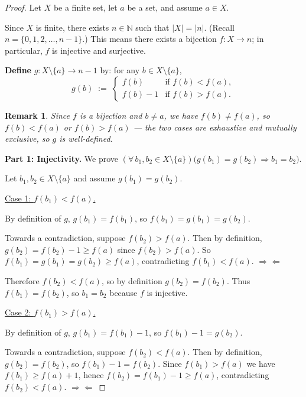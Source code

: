 \documentclass[11pt]{article}
\theoremstyle{defstyle}
\theoremstyle{thmstyle}
\theoremstyle{notstyle}
\newtheorem*{remark}{Remark}
\newcommand{\N}{\mathbb{N}}
\begin{document}
\begin{thmbox}
\begin{proof}
Let $X$ be a finite set, let $a$ be a set, and assume $a \in X$.

Since $X$ is finite, there exists $n \in \N$ such that $|X| = |n|$.
(Recall $n = \{0, 1, 2, \ldots, n-1\}$.)
This means there exists a bijection $f\colon X \to n$; in particular, $f$ is injective
and surjective.

\medskip
\noindent\textbf{Define} $g\colon X \setminus \{a\} \to n-1$ by: for any
$b \in X \setminus \{a\}$,
\[
  g(b) \;:=\;
  \begin{cases}
    f(b)     & \text{if } f(b) < f(a), \\
    f(b) - 1 & \text{if } f(b) > f(a).
  \end{cases}
\]

\begin{notebox}
\begin{remark}
Since $f$ is a bijection and $b \neq a$, we have $f(b) \neq f(a)$, so
$f(b) < f(a)$ or $f(b) > f(a)$ — the two cases are exhaustive and mutually exclusive,
so $g$ is well-defined.
\end{remark}
\end{notebox}

\noindent\textbf{Part 1: Injectivity.}
We prove $(\forall\, b_1, b_2 \in X \setminus \{a\})\bigl(g(b_1) = g(b_2)
\Rightarrow b_1 = b_2\bigr)$.

Let $b_1, b_2 \in X \setminus \{a\}$ and assume $g(b_1) = g(b_2)$.

\medskip
\noindent\underline{Case 1: $f(b_1) < f(a)$.}

By definition of $g$, $g(b_1) = f(b_1)$, so $f(b_1) = g(b_1) = g(b_2)$.

Towards a contradiction, suppose $f(b_2) > f(a)$.
Then by definition, $g(b_2) = f(b_2) - 1 \geq f(a)$ since $f(b_2) > f(a)$.
So $f(b_1) = g(b_1) = g(b_2) \geq f(a)$, contradicting $f(b_1) < f(a)$.
$\Rightarrow\!\Leftarrow$

Therefore $f(b_2) < f(a)$, so by definition $g(b_2) = f(b_2)$.
Thus $f(b_1) = f(b_2)$, so $b_1 = b_2$ because $f$ is injective.

\medskip
\noindent\underline{Case 2: $f(b_1) > f(a)$.}

By definition of $g$, $g(b_1) = f(b_1) - 1$, so $f(b_1) - 1 = g(b_2)$.

Towards a contradiction, suppose $f(b_2) < f(a)$.
Then by definition, $g(b_2) = f(b_2)$, so $f(b_1) - 1 = f(b_2)$.
Since $f(b_1) > f(a)$ we have $f(b_1) \geq f(a) + 1$, hence
$f(b_2) = f(b_1) - 1 \geq f(a)$, contradicting $f(b_2) < f(a)$.
$\Rightarrow\!\Leftarrow$


\end{proof}
\end{thmbox}
\end{document}
